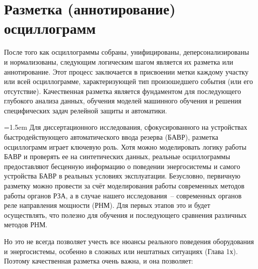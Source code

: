 
\section{Разметка (аннотирование) осциллограмм}\label{sec:ch3_oscillogram_annotation}

После того как осциллограммы собраны, унифицированы, деперсонализированы и
нормализованы, следующим логическим шагом является их разметка или аннотирование. Этот
процесс заключается в присвоении метки каждому участку или всей осциллограмме,
характеризующей тип произошедшего события (или его отсутствие). Качественная разметка
является фундаментом для последующего глубокого анализа данных, обучения моделей
машинного обучения и решения специфических задач релейной защиты и автоматики.

{\emergencystretch=1.5em Для диссертационного исследования, сфокусированного на устройствах быстродействующего автоматического ввода резерва (БАВР), разметка осциллограмм играет ключевую роль. Хотя можно моделировать логику работы БАВР и проверять ее на синтетических данных, реальные осциллограммы предоставляют бесценную информацию о поведении энергосистемы и самого устройства БАВР в реальных условиях эксплуатации. Безусловно, первичную разметку можно провести за счёт моделирования работы современных методов работы органов РЗА, а в случае нашего исследования~-- современных органов реле направления мощности (РНМ). Для первых этапов это и будет осуществлять, что полезно для обучения и последующего сравнения различных методов РНМ.\par}

Но это не всегда позволяет учесть все нюансы реального поведения оборудования и энергосистемы, особенно в сложных или нештатных ситуациях (Глава 1х). Поэтому качественная разметка очень важна, и она позволяет:


